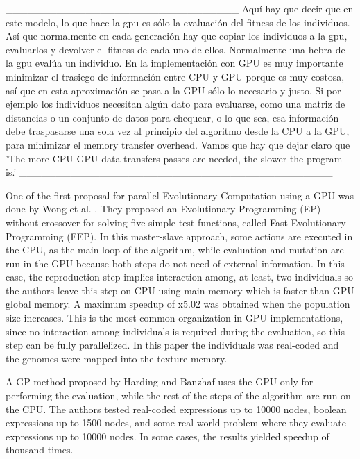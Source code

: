 \documentclass[prodmode,acmtecs]{acmsmall}
\begin{document}
________________________________
Aquí hay que decir que en este modelo, lo que hace la gpu es sólo la evaluación del fitness de los individuos. Así que normalmente en cada generación hay que copiar los individuos a la gpu, evaluarlos y devolver el fitness de cada uno de ellos. Normalmente una hebra de la gpu evalúa un individuo. En la implementación con GPU es muy importante minimizar el trasiego de información entre CPU y GPU porque es muy costosa, así que en esta aproximación se pasa a la GPU sólo lo necesario y justo. Si por ejemplo los individuos necesitan algún dato para evaluarse, como una matriz de distancias o un conjunto de datos para chequear, o lo que sea, esa información debe traspasarse una sola vez al principio del algoritmo desde la CPU a la GPU, para minimizar el memory transfer overhead.  Vamos que hay que dejar claro que 'The more CPU-GPU data transfers passes are needed, the slower the program is.'
___________________________________________



One of the first proposal for parallel Evolutionary Computation using a GPU was done by Wong et al. \cite{man-leung-wong-parallel-2005}. They  proposed an Evolutionary Programming (EP) without crossover for solving five simple test functions, called Fast Evolutionary Programming (FEP). In this master-slave approach, some actions are executed in the CPU, as the main loop of the algorithm, while evaluation and mutation are run in the GPU because both steps do not need of external information. In this case, the reproduction step implies interaction among, at least, two individuals so the authors leave this step on CPU using main memory which is faster than GPU global memory. A maximum speedup of x5.02 was obtained when the population size increases. This is the most common organization in GPU implementations, since no interaction among individuals is required during the evaluation, so this step can be fully parallelized. In this paper the individuals was  real-coded and the genomes were mapped into the texture memory.

A GP method proposed by Harding and Banzhaf \cite{4215552} uses the GPU only for performing the evaluation, while the rest of the steps of the algorithm are run on the CPU. The authors tested real-coded expressions up to 10000 nodes, boolean expressions up to 1500 nodes, and some real world problem where they evaluate expressions up to 10000 nodes. In some cases, the results yielded speedup of thousand times.
\end{document}
